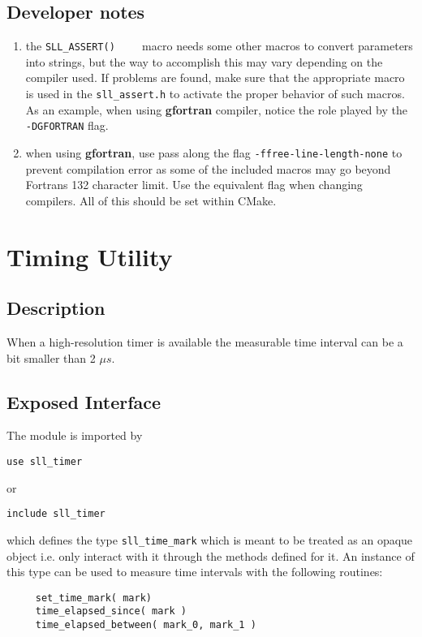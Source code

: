 \documentclass[]{report}   %
\begin{document}
\subsection{Developer notes}
\begin{enumerate}
\item the \verb+SLL_ASSERT()	+ macro needs some other macros to convert parameters into strings, but the way to accomplish this may vary depending on the compiler used. If problems are found, make sure that the appropriate macro is used in the \verb+sll_assert.h+ to activate the proper behavior of such macros. As an example, when using \textbf{gfortran} compiler, notice the role played by the \verb+-DGFORTRAN+ flag.
\item when using \textbf{gfortran}, use pass along the flag \verb+-ffree-line-length-none+ to prevent compilation error as some of the included macros may go beyond Fortrans 132 character limit. Use the equivalent flag when changing compilers. All of this should be set within CMake.
\end{enumerate}



\section{Timing Utility}
\subsection{Description}
When a high-resolution timer is available the measurable time interval can be a bit smaller than 2 $\mu s$.

\subsection{Exposed Interface}

The module is imported by
\begin{verbatim}
use sll_timer
\end{verbatim}
or
\begin{verbatim}
include sll_timer
\end{verbatim}
which defines the type \verb+sll_time_mark+ which is meant to be treated as an opaque object i.e. only interact with it through the methods defined for it. An instance of this type can be used to measure time intervals with the following routines:

\begin{verbatim}
     set_time_mark( mark)
     time_elapsed_since( mark )
     time_elapsed_between( mark_0, mark_1 )
\end{verbatim}
\end{document}
